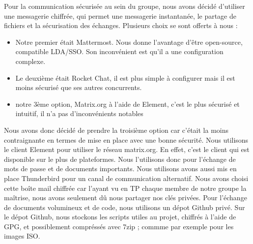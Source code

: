\documentclass[../Livrable1.tex]{subfiles}
\begin{document}
Pour la communication sécurisée au sein du groupe, nous avons décidé d'utiliser une messagerie chiffrée, qui permet une messagerie instantanée, le partage de fichiers et la sécurisation des échanges.
Plusieurs choix se sont offerts à nous :
\begin{itemize}
    \item Notre premier était Mattermost. Nous donne l'avantage d'être open-source, compatible LDA/SSO. Son inconvénient est qu'il a une configuration complexe.
    \item Le deuxième était Rocket Chat, il est plus simple à configurer mais il est moins sécurisé que ses autres concurrents.
    \item notre 3ème option, Matrix.org à l'aide de Element, c'est le plus sécurisé et intuitif, il n'a pas d'inconvénients notables
\end{itemize}
Nous avons donc décidé de prendre la troisième option car c'était la moins contraignante en termes de mise en place avec une bonne sécurité.
Nous utilisons le client Element pour utiliser le réseau matrix.org. En effet, c'est le client qui est disponible sur le plus de plateformes.
Nous l'utilisons donc pour l'échange de mots de passe et de documents importants.
Nous utilisons avons aussi mis en place Thunderbird pour un canal de communication alternatif.
Nous avons choisi cette boîte mail chiffrée car l'ayant vu en TP chaque membre de notre groupe la maîtrise, nous avons seulement dû nous partager nos clés privées.
Pour l'échange de documents volumineux et de code, nous utilisons un dépot Github privé.
Sur le dépot Github, nous stockons les scripts utiles au projet, chiffrés à l'aide de GPG, et possiblement compréssés avec 7zip ; commme par exemple pour les images ISO.
\end{document}
